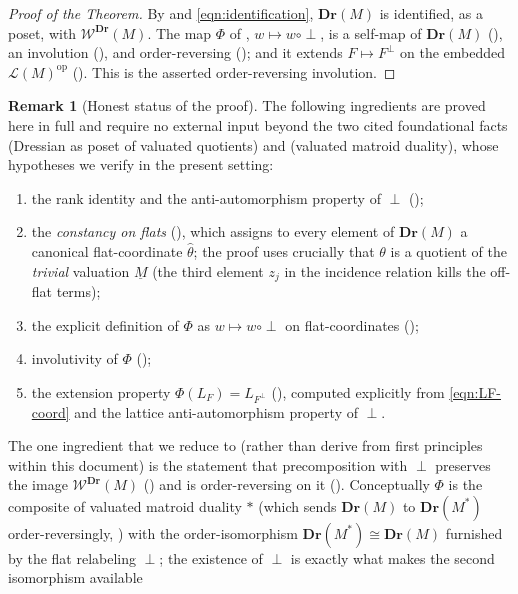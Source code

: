 \documentclass{article}
\theoremstyle{definition}
\newtheorem{remark}[theorem]{Remark}
\newcommand{\op}{\operatorname{op}}
\newcommand{\Dr}{\mathbf{Dr}}
\newcommand{\cLL}{\mathcal{L}}
\newcommand{\cW}{\mathcal{W}}
\begin{document}
\begin{proof}[Proof of the Theorem]
By  and \eqref{eqn:identification}, $\Dr(M)$ is identified, as a poset, with
$\cW^{\Dr}(M)$. The map $\Phi$ of , $w\mapsto w\circ\perp$, is a self-map of $\Dr(M)$
(), an involution (), and order-reversing (); and it
extends $F\mapsto F^{\perp}$ on the embedded $\cLL(M)^{\op}$ (). This is the asserted
order-reversing involution.
\end{proof}

\begin{remark}[Honest status of the proof]\label{rmk:honest}
The following ingredients are proved here in full and require no external input beyond the two cited
foundational facts  (Dressian as poset of valuated quotients) and
 (valuated matroid duality), whose hypotheses we verify in the present setting:
\begin{enumerate}
\item the rank identity and the anti-automorphism property of $\perp$ ();
\item the \emph{constancy on flats} (), which assigns to every element of
$\Dr(M)$ a canonical flat-coordinate $\widehat\theta$; the proof uses crucially that $\theta$ is a
quotient of the \emph{trivial} valuation $\underline M$ (the third element $z_j$ in the incidence
relation kills the off-flat terms);
\item the explicit definition of $\Phi$ as $w\mapsto w\circ\perp$ on flat-coordinates
();
\item involutivity of $\Phi$ ();
\item the extension property $\Phi(L_F)=L_{F^{\perp}}$ (), computed explicitly from
\eqref{eqn:LF-coord} and the lattice anti-automorphism property of $\perp$.
\end{enumerate}
The one ingredient that we reduce to (rather than derive from first principles within this document)
is the statement that precomposition with $\perp$ preserves the image $\cW^{\Dr}(M)$
() and is order-reversing on it (). Conceptually $\Phi$ is the
composite of valuated matroid duality $*$ (which sends $\Dr(M)$ to $\Dr(M^{*})$ order-reversingly,
) with the order-isomorphism $\Dr(M^{*})\cong\Dr(M)$ furnished by the flat
relabeling $\perp$; the existence of $\perp$ is exactly what makes the second isomorphism available

\end{remark}
\end{document}
